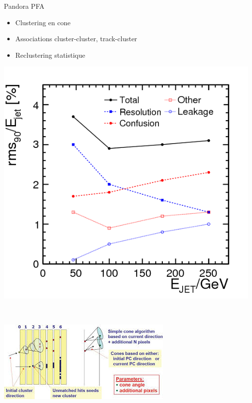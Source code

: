 \documentclass[8pt]{beamer}
\begin{document}
\begin{frame}
\begin{minipage}{0.5\linewidth}
\begin{center}
      \end{center}      
    \end{minipage}
  \end{frame}
  
  \begin{frame}
  \frametitle{\secname}
  \framesubtitle{\subsecname}
    \begin{minipage}{0.38\linewidth}
      \begin{block}{Pandora PFA}
        \begin{itemize}
          \item Clustering en cone
          \item Associations cluster-cluster, track-cluster
          \item Reclustering statistique
        \end{itemize}
      \end{block}
      \includegraphics[width=0.9\linewidth]{pandorapfa_jet_energy_resolution.png}
    \end{minipage} ~\hfill
    \begin{minipage}{0.6\linewidth}
      \includegraphics[width=0.9\linewidth]{pandorapfa_cones.jpg} \\

\end{minipage}
\end{frame}
\end{document}
